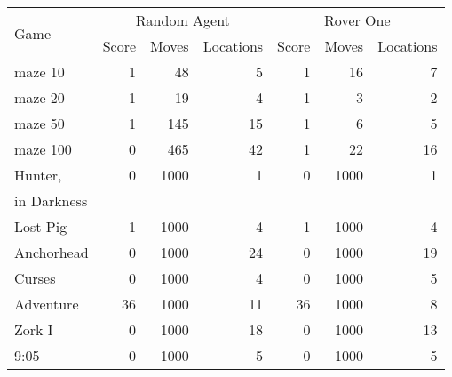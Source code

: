 \begin{tabular}{l|rrr|rrr}
\toprule
\multirow{2}{*}{Game} & \multicolumn{3}{c|}{Random Agent} & \multicolumn{3}{c}{Rover One}\\
\cmidrule{2-7}
& Score & Moves & Locations & Score & Moves & Locations \\
\midrule
maze 10 & 1 & 48 & 5 & 1 & 16 & 7 \\
maze 20 & 1 & 19 & 4 & 1 & 3 & 2 \\
maze 50 & 1 & 145 & 15 & 1 & 6 & 5 \\
maze 100 & 0 & 465 & 42 & 1 & 22 & 16 \\
Hunter, & 0 & 1000 & 1 & 0 & 1000 & 1 \\
in Darkness &&&&&& \\
Lost Pig & 1 & 1000 & 4 & 1 & 1000 & 4 \\
Anchorhead & 0 & 1000 & 24 & 0 & 1000 & 19 \\
Curses & 0 & 1000 & 4 & 0 & 1000 & 5 \\
Adventure & 36 & 1000 & 11 & 36 & 1000 & 8 \\
Zork I & 0 & 1000 & 18 & 0 & 1000 & 13 \\
9:05 & 0 & 1000 & 5 & 0 & 1000 & 5 \\
\bottomrule
\end{tabular}
